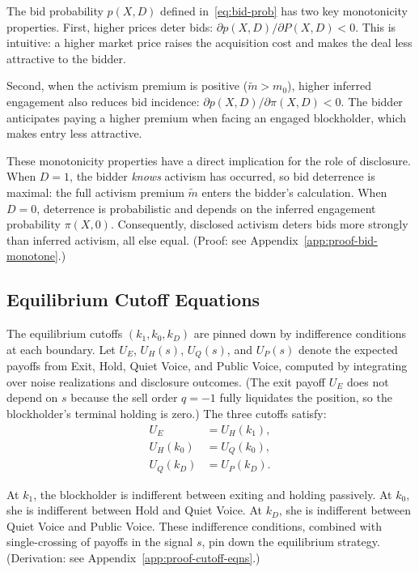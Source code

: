 \documentclass[11pt]{article}
\newcommand{\1}{\mathbf{1}}
\begin{document}
The bid probability $p(X,D)$ defined in~\eqref{eq:bid-prob} has two key monotonicity properties. First, higher prices deter bids: $\partial p(X,D)/\partial P(X,D)<0$. This is intuitive: a higher market price raises the acquisition cost and makes the deal less attractive to the bidder.

Second, when the activism premium is positive ($\tilde{m}>m_0$), higher inferred engagement also reduces bid incidence: $\partial p(X,D)/\partial\pi(X,D)<0$. The bidder anticipates paying a higher premium when facing an engaged blockholder, which makes entry less attractive.

These monotonicity properties have a direct implication for the role of disclosure. When $D=1$, the bidder \emph{knows} activism has occurred, so bid deterrence is maximal: the full activism premium $\tilde{m}$ enters the bidder's calculation. When $D=0$, deterrence is probabilistic and depends on the inferred engagement probability $\pi(X,0)$. Consequently, disclosed activism deters bids more strongly than inferred activism, all else equal. (Proof: see Appendix~\ref{app:proof-bid-monotone}.)

%
\subsection{Equilibrium Cutoff Equations}
%

The equilibrium cutoffs $(k_1,k_0,k_D)$ are pinned down by indifference conditions at each boundary. Let $U_E$, $U_H(s)$, $U_Q(s)$, and $U_P(s)$ denote the expected payoffs from Exit, Hold, Quiet Voice, and Public Voice, computed by integrating over noise realizations and disclosure outcomes. (The exit payoff $U_E$ does not depend on $s$ because the sell order $q=-1$ fully liquidates the position, so the blockholder's terminal holding is zero.) The three cutoffs satisfy:
\begin{align}
U_E &= U_H(k_1), \label{eq:k1} \\
U_H(k_0) &= U_Q(k_0), \label{eq:k0} \\
U_Q(k_D) &= U_P(k_D). \label{eq:kD}
\end{align}

At $k_1$, the blockholder is indifferent between exiting and holding passively. At $k_0$, she is indifferent between Hold and Quiet Voice. At $k_D$, she is indifferent between Quiet Voice and Public Voice. These indifference conditions, combined with single-crossing of payoffs in the signal $s$, pin down the equilibrium strategy. (Derivation: see Appendix~\ref{app:proof-cutoff-eqns}.)
\end{document}
